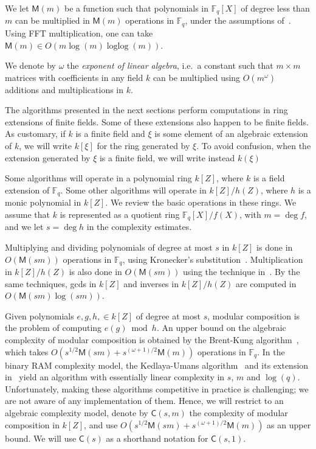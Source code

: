\documentclass[12pt]{article}
\theoremstyle{plain}
\theoremstyle{definition}
\DeclareMathOperator{\loglog}{loglog}
\def\F{\ensuremath{\mathbb{F}}}
\def\MM{\ensuremath{\mathsf{M}}}
\def\CC{\ensuremath{\mathsf{C}}}
\newcounter{algorithm}
\begin{document}
We let $\MM(m)$ be a function such that polynomials in $\F_q[X]$ of
degree less than $m$ can be multiplied in $\MM(m)$ operations in
$\F_q$, under the assumptions of~\cite[Ch.~8.3]{vzGG}. Using FFT
multiplication, one can take $\MM(m)\in O(m\log (m) \loglog (m))$.

We denote by $\omega$ the \emph{exponent of linear algebra}, i.e.\ a
constant such that $m\times m$ matrices with coefficients in any field
$k$ can be multiplied using $O(m^\omega)$ additions and
multiplications in $k$.

The algorithms presented in the next sections perform computations in
ring extensions of finite fields. Some of these extensions also happen
to be finite fields. As customary, if $k$ is a finite field and $\xi$
is some element of an algebraic extension of $k$, we will write
$k[\xi]$ for the ring generated by $\xi$. To avoid confusion, when the
extension generated by $\xi$ is a finite field, we will write instead
$k(\xi)$

Some algorithms will operate in a polynomial ring $k[Z]$, where $k$ is
a field extension of $\F_q$. Some other algorithms will operate in
$k[Z]/h(Z)$, where $h$ is a monic polynomial in $k[Z]$. We review the
basic operations in these rings. We assume that $k$ is represented as
a quotient ring $\F_q[X]/f(X)$, with $m=\deg f$, and we let $s=\deg h$
in the complexity estimates.

Multiplying and dividing polynomials of degree at most $s$ in $k[Z]$
is done in $O(\MM(sm))$ operations in $\F_q$, using Kronecker's
substitution~\cite{moenck76,kaltofen87,vzGG,vzgathen+shoup92,harvey09}.
Multiplication in $k[Z]/h(Z)$ is also done in $O(\MM(sm))$ using the
technique in~\cite{pascal+schost06}. By the same techniques, gcds in
$k[Z]$ and inverses in $k[Z]/h(Z)$ are computed in $O(\MM(sm)\log(sm))$.

Given polynomials $e,g,h,\in k[Z]$ of degree at most $s$, modular
composition is the problem of computing $e(g) \bmod h$. An upper bound
on the algebraic complexity of modular composition is obtained by the
Brent-Kung algorithm~\cite{brent+kung}, which takes
$O(s^{1/2}\MM(sm) + s^{(\omega+1)/2}\MM(m))$ operations in $\F_q$.  In
the binary RAM complexity model, the Kedlaya-Umans
algorithm~\cite{KeUm11} and its extension in~\cite{PoSc13a} yield an
algorithm with essentially linear complexity in $s$, $m$ and
$\log(q)$. Unfortunately, making these algorithms competitive in
practice is challenging; we are not aware of any implementation of
them. Hence, we will restrict to an algebraic complexity model, denote
by $\CC(s,m)$ the complexity of modular composition in $k[Z]$, and use
$O(s^{1/2}\MM(sm) + s^{(\omega+1)/2}\MM(m))$ as an upper bound.  We
will use $\CC(s)$ as a shorthand notation for $\CC(s,1)$.
\end{document}
